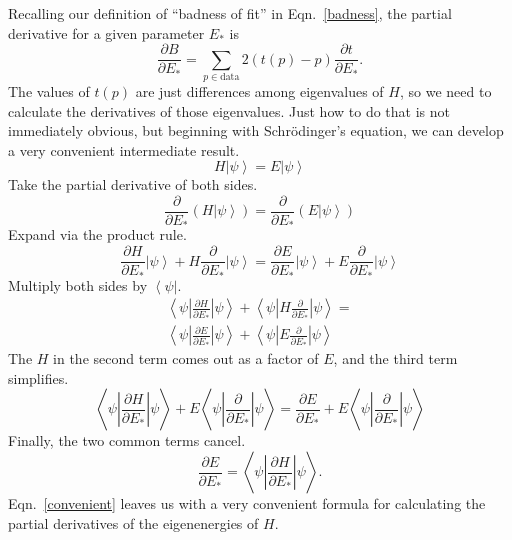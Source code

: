 \documentclass[twocolumn]{revtex4}
\newcommand{\bra}[1]{\left< #1 \right|}
\newcommand{\ket}[1]{\left| #1 \right>}
\newcommand{\innerp}[3]{\textstyle\left< #1 \left| #2 \right| #3 \right>}
\begin{document}
Recalling our definition of ``badness of fit'' in Eqn.~\eqref{badness},
the partial derivative for a given parameter $E_*$ is
\begin{equation}
  \label{partials}
  \frac{\partial B}{\partial E_{*}} =
  \sum_{p \in \text{data}}2(t(p)-p)\frac{\partial t}{\partial E_*}.
\end{equation}
The values of $t(p)$ are just differences among eigenvalues of $H$, so we
need to calculate the derivatives of those eigenvalues. Just how to do
that is not immediately obvious, but beginning with Schr\"odinger's
equation, we can develop a very convenient intermediate result.
\begin{equation}
  H\ket{\psi} = E\ket{\psi}
\end{equation}
Take the partial derivative of both sides.
\begin{equation}
  \frac{\partial}{\partial E_*} (H\ket{\psi}) =
  \frac{\partial}{\partial E_*} (E\ket{\psi})
\end{equation}
Expand via the product rule.
\begin{equation}
  \frac{\partial H}{\partial E_*}\ket{\psi} +
  H\frac{\partial}{\partial E_*}\ket{\psi} =
  \frac{\partial E}{\partial E_*}\ket{\psi} +
  E\frac{\partial}{\partial E_*}\ket{\psi}
\end{equation}
Multiply both sides by $\bra{\psi}$.
\begin{multline}
  \innerp{\psi}{\frac{\partial H}{\partial E_*}}{\psi} +
  \innerp{\psi}{H\frac{\partial}{\partial E_*}}{\psi} =\\
  \innerp{\psi}{\frac{\partial E}{\partial E_*}}{\psi}+
  \innerp{\psi}{E\frac{\partial}{\partial E_*}}{\psi}
\end{multline}
The $H$ in the second term comes out as a factor of $E$, and the third
term simplifies.
\begin{equation}
  \innerp{\psi}{\frac{\partial H}{\partial E_*}}{\psi} +
  E\innerp{\psi}{\frac{\partial}{\partial E_*}}{\psi} =
  \frac{\partial E}{\partial E_*} +
  E\innerp{\psi}{\frac{\partial}{\partial E_*}}{\psi}
\end{equation}
Finally, the two common terms cancel.
\begin{equation}
  \frac{\partial E}{\partial E_*} =
  \innerp{\psi}{\frac{\partial H}{\partial E_*}}{\psi}.
  \label{convenient}
\end{equation}
Eqn.~\eqref{convenient} leaves us with a very convenient formula for
calculating the partial derivatives of the eigenenergies of $H$.
\end{document}
